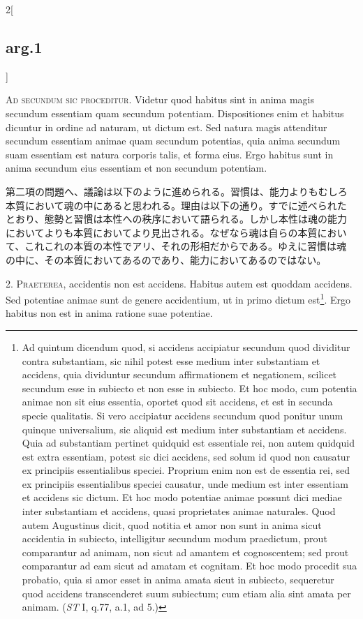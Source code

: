 \documentclass[paper=a4paper,fontsize=10pt,jafontsize=9pt,titlepage]{jlreq}
\begin{document}
\begin{paracol}{2}[\subsection{arg.1}]

{\scshape Ad secundum sic proceditur}. Videtur quod habitus sint in
anima magis secundum essentiam quam secundum potentiam. Dispositiones
enim et habitus dicuntur in ordine ad naturam, ut dictum est. Sed
natura magis attenditur secundum essentiam animae quam secundum
potentias, quia anima secundum suam essentiam est natura corporis
talis, et forma eius. Ergo habitus sunt in anima secundum eius
essentiam et non secundum potentiam.

\switchcolumn

第二項の問題へ、議論は以下のように進められる。習慣は、能力よりもむしろ
本質において魂の中にあると思われる。理由は以下の通り。すでに述べられた
とおり、態勢と習慣は本性への秩序において語られる。しかし本性は魂の能力
においてよりも本質においてより見出される。なぜなら魂は自らの本質におい
て、これこれの本質の本性でアリ、それの形相だからである。ゆえに習慣は魂
の中に、その本質においてあるのであり、能力においてあるのではない。


2. {\scshape Praeterea}, accidentis non est accidens. Habitus autem
est quoddam accidens. Sed potentiae animae sunt de genere accidentium,
ut in primo dictum est\footnote{Ad quintum dicendum quod, si accidens
accipiatur secundum quod dividitur contra substantiam, sic nihil
potest esse medium inter substantiam et accidens, quia dividuntur
secundum affirmationem et negationem, scilicet secundum esse in
subiecto et non esse in subiecto. Et hoc modo, cum potentia animae non
sit eius essentia, oportet quod sit accidens, et est in secunda specie
qualitatis. Si vero accipiatur accidens secundum quod ponitur unum
quinque universalium, sic aliquid est medium inter substantiam et
accidens. Quia ad substantiam pertinet quidquid est essentiale rei,
non autem quidquid est extra essentiam, potest sic dici accidens, sed
solum id quod non causatur ex principiis essentialibus
speciei. Proprium enim non est de essentia rei, sed ex principiis
essentialibus speciei causatur, unde medium est inter essentiam et
accidens sic dictum. Et hoc modo potentiae animae possunt dici mediae
inter substantiam et accidens, quasi proprietates animae
naturales. Quod autem Augustinus dicit, quod notitia et amor non sunt
in anima sicut accidentia in subiecto, intelligitur secundum modum
praedictum, prout comparantur ad animam, non sicut ad amantem et
cognoscentem; sed prout comparantur ad eam sicut ad amatam et
cognitam. Et hoc modo procedit sua probatio, quia si amor esset in
anima amata sicut in subiecto, sequeretur quod accidens transcenderet
suum subiectum; cum etiam alia sint amata per animam. ({\itshape ST} I, q.77, a.1, ad 5.)}. Ergo habitus
non est in anima ratione suae potentiae.


\end{paracol}
\end{document}
